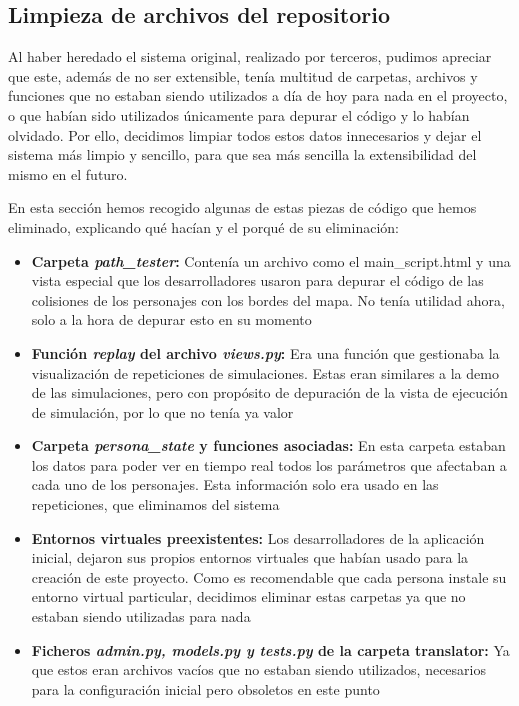 \subsection{Limpieza de archivos del repositorio}
\label{limpiezaArchivos}

Al haber heredado el sistema original, realizado por terceros, pudimos apreciar que este, además de no ser extensible, tenía multitud de carpetas, archivos y funciones que no estaban siendo utilizados a día de hoy para nada en el proyecto, o que habían sido utilizados únicamente para depurar el código y lo habían olvidado. Por ello, decidimos limpiar todos estos datos innecesarios y dejar el sistema más limpio y sencillo, para que sea más sencilla la extensibilidad del mismo en el futuro.

En esta sección hemos recogido algunas de estas piezas de código que hemos eliminado, explicando qué hacían y el porqué de su eliminación:

\begin{itemize}
	\item \textbf{Carpeta \textit{path\_tester}:} Contenía un archivo como el main\_script.html y una vista especial que los desarrolladores usaron para depurar el código de las colisiones de los personajes con los bordes del mapa. No tenía utilidad ahora, solo a la hora de depurar esto en su momento
	
	\item \textbf{Función \textit{replay} del archivo \textit{views.py}:} Era una función que gestionaba la visualización de repeticiones de simulaciones. Estas eran similares a la demo de las simulaciones, pero con propósito de depuración de la vista de ejecución de simulación, por lo que no tenía ya valor
	
	\item \textbf{Carpeta \textit{persona\_state} y funciones asociadas:} En esta carpeta estaban los datos para poder ver en tiempo real todos los parámetros que afectaban a cada uno de los personajes. Esta información solo era usado en las repeticiones, que eliminamos del sistema
	
	\item \textbf{Entornos virtuales preexistentes:} Los desarrolladores de la aplicación inicial, dejaron sus propios entornos virtuales que habían usado para la creación de este proyecto. Como es recomendable que cada persona instale su entorno virtual particular, decidimos eliminar estas carpetas ya que no estaban siendo utilizadas para nada
	
	\item \textbf{Ficheros \textit{admin.py, models.py y tests.py} de la carpeta translator:} Ya que estos eran archivos vacíos que no estaban siendo utilizados,  necesarios para la configuración inicial pero obsoletos en este punto
	
\end{itemize}

